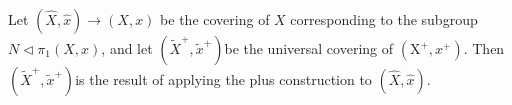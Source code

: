 \begin{prop}
Let $(\hat{X}, \hat{x}) \longrightarrow(X, x)$ be the covering of $X$ corresponding to the subgroup $N \triangleleft \pi_1(X, x)$, and let $\left(\tilde{X}^{+}, \tilde{x}^{+}\right)$be the universal covering of $\left(\mathrm{X}^{+}, x^{+}\right)$. Then $\left(\tilde{X}^{+}, \tilde{x}^{+}\right)$is the result of applying the plus construction to $(\hat{X}, \hat{x})$.

\end{prop}

